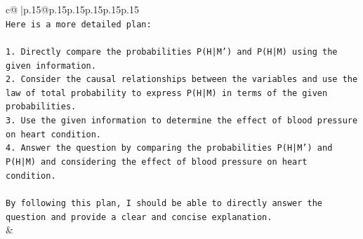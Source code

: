 \documentclass{article}
\begin{document}
{\begin{supertabular}{c@{$\;$}|p{.15\linewidth}@{}p{.15\linewidth}p{.15\linewidth}p{.15\linewidth}p{.15\linewidth}p{.15\linewidth}}
{{{\\ 
\texttt{Here is a more detailed plan:} \\
\\ 
\texttt{1. Directly compare the probabilities P(H|M') and P(H|M) using the given information.} \\
\texttt{2. Consider the causal relationships between the variables and use the law of total probability to express P(H|M) in terms of the given probabilities.} \\
\texttt{3. Use the given information to determine the effect of blood pressure on heart condition.} \\
\texttt{4. Answer the question by comparing the probabilities P(H|M') and P(H|M) and considering the effect of blood pressure on heart condition.} \\
\\ 
\texttt{By following this plan, I should be able to directly answer the question and provide a clear and concise explanation.} \\
            }
        }
    }
    & \\ \\

\end{supertabular}
}
\end{document}
